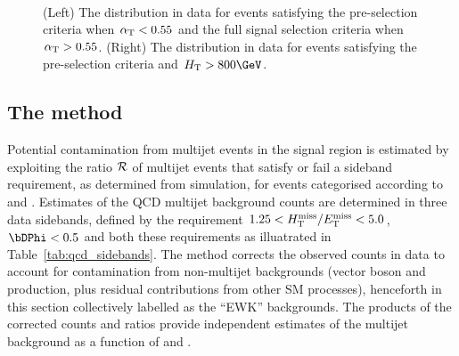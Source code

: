 \begin{figure}[!t]
 \centering
  \\
 \caption{(Left) The \alphat distribution in data for events
   satisfying the pre-selection criteria when $\alpha_{\text{T}} < 0.55$ and the
   full signal selection criteria when $\alpha_{\text{T}} > 0.55$. (Right) The
   \bdphi distribution in data for events satisfying the pre-selection
   criteria and $\scalht > 800\GeV$. 
 }
 \label{fig:alphat_bdphi_distr}
\end{figure}

\subsection{The method}
\label{sec:qcdMethod}

Potential contamination from multijet events in the signal region is
estimated by exploiting the ratio $\mbox{$\mathcal{R}$}$ of multijet events that
satisfy or fail a sideband requirement, as determined from
simulation, for events categorised according to \njet and \scalht.
Estimates of the QCD multijet background counts are determined in
three data sidebands, defined by the requirement $1.25 < \mbox{$H_{\rm T}^{\rm miss}$}/\mbox{$E_\text{T}^{\rm miss}$} <
5.0$, $\bDPhi<0.5$ and both these requirements as illuatrated in
Table~\ref{tab:qcd_sidebands}. The method corrects the observed counts
in data to account for contamination from non-multijet backgrounds
(vector boson and \ttbar production, plus residual contributions from
other SM processes), henceforth in this section collectively labelled
as the ``EWK'' backgrounds. The products of the corrected counts and
ratios provide independent estimates of the multijet background as a
function of \njet and \scalht.

